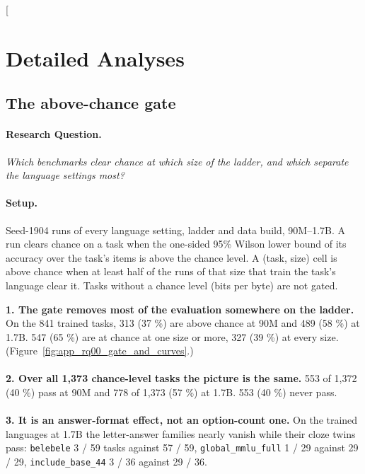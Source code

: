 \clearpage
\twocolumn[{%
\section{Detailed Analyses}
\label{app:analyses}

\subsection{The above-chance gate}
\label{app:rq00_gate_and_curves}

\noindent\begin{minipage}[t]{0.485\textwidth}
\vspace{0pt}
\paragraph{Research Question.} \emph{Which benchmarks clear chance at which size of the ladder, and which separate the language settings most?}

\paragraph{Setup.} Seed-1904 runs of every language setting, ladder and data build, 90M--1.7B. A run clears chance on a task when the one-sided 95\% Wilson lower bound of its accuracy over the task's items is above the chance level. A (task, size) cell is above chance when at least half of the runs of that size that train the task's language clear it. Tasks without a chance level (bits per byte) are not gated.
\end{minipage}\hfill
\begin{minipage}[t]{0.485\textwidth}
\vspace{0pt}
\begin{rqfinding}
\textbf{1. The gate removes most of the evaluation somewhere on the ladder.} On the 841 trained tasks, 313 (37 \%) are above chance at 90M and 489 (58 \%) at 1.7B. 547 (65 \%) are at chance at one size or more, 327 (39 \%) at every size. (Figure~\ref{fig:app_rq00_gate_and_curves}.)
\\
\\
\textbf{2. Over all 1,373 chance-level tasks the picture is the same.} 553 of 1,372 (40 \%) pass at 90M and 778 of 1,373 (57 \%) at 1.7B. 553 (40 \%) never pass.
\\
\\
\textbf{3. It is an answer-format effect, not an option-count one.} On the trained languages at 1.7B the letter-answer families nearly vanish while their cloze twins pass: \texttt{belebele} 3 / 59 tasks against 57 / 59, \texttt{global\_mmlu\_full} 1 / 29 against 29 / 29, \texttt{include\_base\_44} 3 / 36 against 29 / 36.
\end{rqfinding}
\end{minipage}

}
